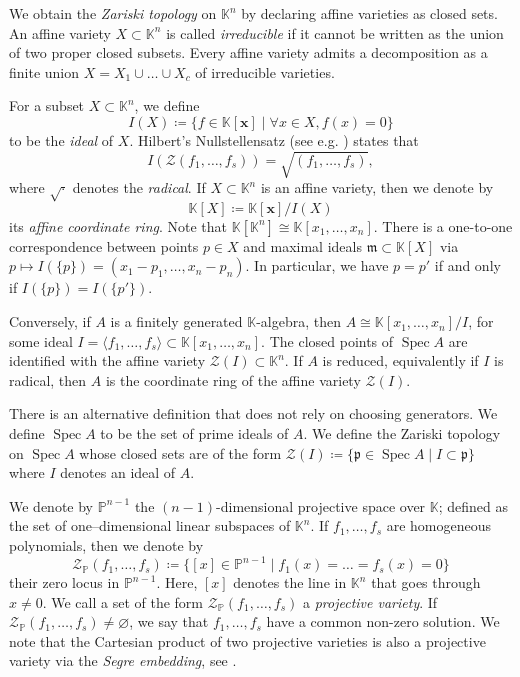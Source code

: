 \documentclass[11pt,a4paper]{article}
\newcommand{\ideal}[1]{\langle #1 \rangle}
\numberwithin{equation}{section}
\newcommand{\PP}{\mathbb{P}}
\newcommand{\KK}{\mathbb{K}}
\newcommand{\cZ}{\mathcal{Z}}
\newcommand{\xx}{\ensuremath{\boldsymbol{x}}}
\DeclareMathOperator{\Spec}{Spec}
\begin{document}
We obtain the \emph{Zariski topology} on $\KK^n$ by declaring affine varieties as closed sets.
An affine variety $X\subset\KK^n$ is called \emph{irreducible} if it cannot be written as the union of two proper closed subsets. 
Every affine variety admits a decomposition as a finite union $X=X_1\cup\dots\cup X_c$  of irreducible varieties.

For a subset $X\subset\KK^n$, we define \[
I(X) \coloneqq \{ f\in \KK[\xx] \mid \forall x\in X, f(x)=0 \}
\] to be the \emph{ideal} of $X$. 
Hilbert's Nullstellensatz (see e.g. \cite[Chapter 4, \S 1]{Cox-Little-Oshea-25}) states that \[
I(\cZ(f_1,\dots,f_s)) = \sqrt{(f_1,\dots,f_s)},
\] where $\sqrt{\cdot}$ denotes the \emph{radical}.
If $X\subset\KK^n$ is an affine variety, then we denote by \[
\KK[X] \coloneqq \KK[\xx]/I(X)
\] its \emph{affine coordinate ring}.
Note that $\KK[\KK^n]\cong\KK[x_1,\dots,x_n]$.
There is a one-to-one correspondence between points $p\in X$ and maximal ideals $\mathfrak{m}\subset\KK[X]$ via $p\mapsto I(\{p\})=(x_1-p_1,\dots,x_n-p_n)$.
In particular, we have $p=p'$ if and only if $I(\{ p\})=I(\{p'\})$.

Conversely, if $A$ is a finitely generated $\KK$-algebra, then
$A \cong \KK[x_1,\dots,x_n]/I$, for some ideal
$I=\ideal{f_1,\dots,f_s}\subset \KK[x_1,\dots,x_n]$.
The closed points of $\Spec A$ are identified with the affine variety
$\cZ(I)\subset \KK^n
$.
If $A$ is reduced, equivalently if $I$ is radical, then $A$ is the coordinate
ring of the affine variety $\cZ(I)$.


There is an alternative definition that does not rely on choosing generators. 
We define $\Spec A$ to be the set of prime ideals of $A$.
We define the Zariski topology on $\Spec A$ whose closed sets are of the form $\cZ(I)\coloneqq\{\mathfrak{p}\in \Spec A\mid I\subset \mathfrak{p}\}$ where $I$ denotes an ideal of $A$.

We denote by $\PP^{n-1}$ the $(n-1)$-dimensional projective space over $\KK$; defined as the set of one--dimensional linear subspaces of $\KK^n$.
If $f_1,\dots,f_s$ are homogeneous polynomials, then we denote by \[
\cZ_{\PP}(f_1,\dots,f_s) \coloneqq \{[x]\in\PP^{n-1}\mid f_1(x)=\dots=f_s(x)=0\}
\] their zero locus in $\PP^{n-1}$.
Here, $[x]$ denotes the line in $\KK^n$ that goes through $x\neq 0$.
We call a set of the form $\cZ_{\PP}(f_1,\dots,f_s)$ a \emph{projective variety}.
If $\cZ_{\PP}(f_1,\dots,f_s)\neq\varnothing$, we say that $f_1,\dots,f_s$ have a common non-zero solution.
We note that the Cartesian product of two projective varieties is also a projective variety via the \emph{Segre embedding}, see \cite[Example~2.21]{Harris-93}.
\end{document}
